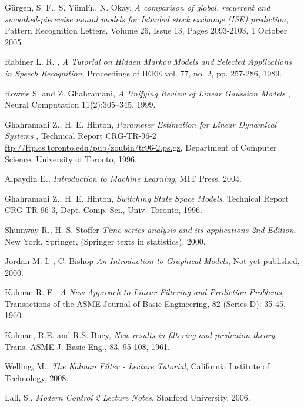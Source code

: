 
\begin{thebibliography}{99}
  
 Gürgen, S. F., S. Yümlü., N. Okay,
  {\em A comparison of global, recurrent and smoothed-piecewise neural models
    for Istanbul stock exchange (ISE) prediction}, 
  Pattern Recognition Letters, Volume 26, Issue 13, Pages 2093-2103, 
  1 October 2005.

 Rabiner L. R. , 
  {\em A Tutorial on Hidden Markov Models and Selected Applications in Speech Recognition}, 
  Proceedings of IEEE vol. 77, no. 2, pp. 257-286, 
  1989.

 Roweis S. and Z. Ghahramani,
  {\em  A Unifying Review of Linear Gaussian Models },
   Neural Computation 11(2):305--345, 
   1999.
   
 Ghahramani Z., H. E. Hinton, 
  {\em Parameter Estimation for Linear Dynamical Systems },
   Technical Report CRG-TR-96-2  
   \url{ftp://ftp.cs.toronto.edu/pub/zoubin/tr96-2.ps.gz},
   Department of Computer Science, University of Toronto, 
   1996.

 Alpaydin E., 
  {\em Introduction to Machine Learning},
  MIT Press, 
  2004.   
   
 Ghahramani Z., H. E. Hinton,
  {\em Switching State Space Models},
  Technical Report CRG-TR-96-3, Dept. Comp. Sci., Univ. Toronto, 
  1996.
   
 Shumway R., H. S. Stoffer
  {\em Time series analysis and its applications 2nd Edition},
   New York, Springer, (Springer texts in statistics),
   2000.
   
 Jordan M. I. , C. Bishop
  {\em An Introduction to Graphical Models},
   Not yet published, 
   2000.

 Kalman R. E.,
  {\em A New Approach to Linear Filtering and Prediction Problems},
  Transactions of the ASME-Journal of Basic Engineering, 82 (Series D): 35-45, 
  1960.

 Kalman, R.E. and R.S. Bucy, 
  {\em New results in filtering and prediction theory},
  Trans. ASME J. Basic Eng., 83, 95-108,
  1961.
  
 Welling, M.,
  {\em The Kalman Filter - Lecture Tutorial},
   California Institute of Technology,
   2008.
   
 Lall, S.,
  {\em Modern Control 2 Lecture Notes},
   Stanford University,
   2006.
   

\end{thebibliography}
